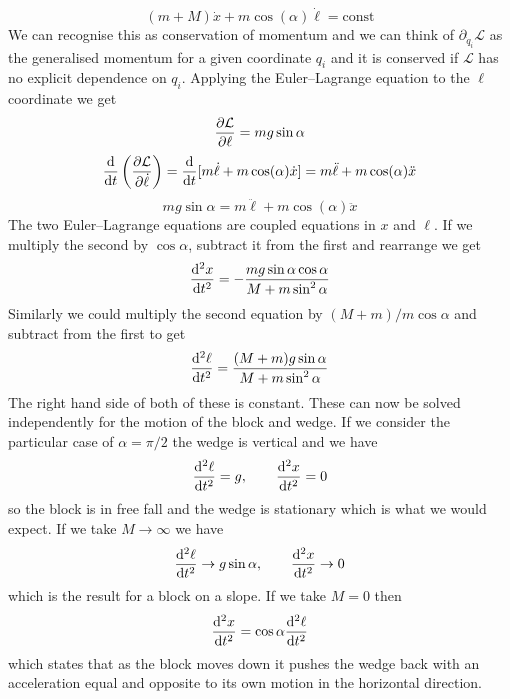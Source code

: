 \documentclass{article}
\newcommand{\LL}{\mathcal{L}}
\begin{document}
    \[(m + M)\dot x + m\cos(\alpha)\dot\ell = \text{const}\]
    We can recognise this as conservation of momentum and we can think of \(\partial_{\dot q_i}\LL\) as the generalised momentum for a given coordinate \(q_i\) and it is conserved if \(\LL\) has no explicit dependence on \(q_i\).
    Applying the Euler--Lagrange equation to the \(\ell\) coordinate we get
    \[\pdv{\LL}{\ell} = mg\sin\alpha\]
    \[\dv{t}\left(\pdv{\LL}{\dot\ell}\right) = \dv{t}[m\dot\ell + m\cos(\alpha)\dot x] = m\ddot\ell + m\cos(\alpha)\ddot x\]
    \[mg\sin\alpha = m\ddot\ell + m\cos(\alpha)\ddot x\]
    The two Euler--Lagrange equations are coupled equations in \(x\) and \(\ell\).
    If we multiply the second by \(\cos\alpha\), subtract it from the first and rearrange we get
    \[\dv[2]{x}{t} = -\frac{mg\sin\alpha\cos\alpha}{M + m\sin^2\alpha}\]
    Similarly we could multiply the second equation by \((M + m)/m\cos\alpha\) and subtract from the first to get
    \[\dv[2]{\ell}{t} = \frac{(M + m)g\sin\alpha}{M + m\sin^2\alpha}\]
    The right hand side of both of these is constant.
    These can now be solved independently for the motion of the block and wedge.
    If we consider the particular case of \(\alpha = \pi/2\) the wedge is vertical and we have
    \[\dv[2]{\ell}{t} = g,\qquad \dv[2]{x}{t} = 0\]
    so the block is in free fall and the wedge is stationary which is what we would expect.
    If we take \(M\to\infty\) we have
    \[\dv[2]{\ell}{t}\to g\sin\alpha,\qquad \dv[2]{x}{t}\to 0\]
    which is the result for a block on a slope.
    If we take \(M = 0\) then
    \[\dv[2]{x}{t} = \cos\alpha\dv[2]{\ell}{t}\]
    which states that as the block moves down it pushes the wedge back with an acceleration equal and opposite to its own motion in the horizontal direction.
    
\end{document}
